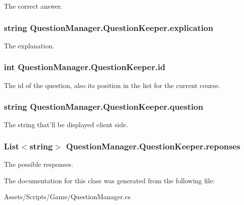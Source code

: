 The correct answer.

\hypertarget{class_question_manager_1_1_question_keeper_a6034ad0eb05b0a295e4fedea05d42466}{
\subsubsection[{explication}]{\setlength{\rightskip}{0pt plus 5cm}string Question\-Manager.\-Question\-Keeper.\-explication}}\label{class_question_manager_1_1_question_keeper_a6034ad0eb05b0a295e4fedea05d42466}


The explanation.

\hypertarget{class_question_manager_1_1_question_keeper_a138a6e1780e60984e78213c87a07d17c}{
\subsubsection[{id}]{\setlength{\rightskip}{0pt plus 5cm}int Question\-Manager.\-Question\-Keeper.\-id}}\label{class_question_manager_1_1_question_keeper_a138a6e1780e60984e78213c87a07d17c}


The id of the question, also its position in the list for the current course. 

\hypertarget{class_question_manager_1_1_question_keeper_a2d1efc6611877e295d3b8c3420105c07}{
\subsubsection[{question}]{\setlength{\rightskip}{0pt plus 5cm}string Question\-Manager.\-Question\-Keeper.\-question}}\label{class_question_manager_1_1_question_keeper_a2d1efc6611877e295d3b8c3420105c07}


The string that'll be displayed client side.

\hypertarget{class_question_manager_1_1_question_keeper_ae15a995b88e9a00ff9097a3b298c8ca1}{
\subsubsection[{reponses}]{\setlength{\rightskip}{0pt plus 5cm}List$<$string$>$ Question\-Manager.\-Question\-Keeper.\-reponses}}\label{class_question_manager_1_1_question_keeper_ae15a995b88e9a00ff9097a3b298c8ca1}


The possible responses.



The documentation for this class was generated from the following file\-:\begin{DoxyCompactItemize}
\item 
Assets/\-Scripts/\-Game/Question\-Manager.\-cs\end{DoxyCompactItemize}
